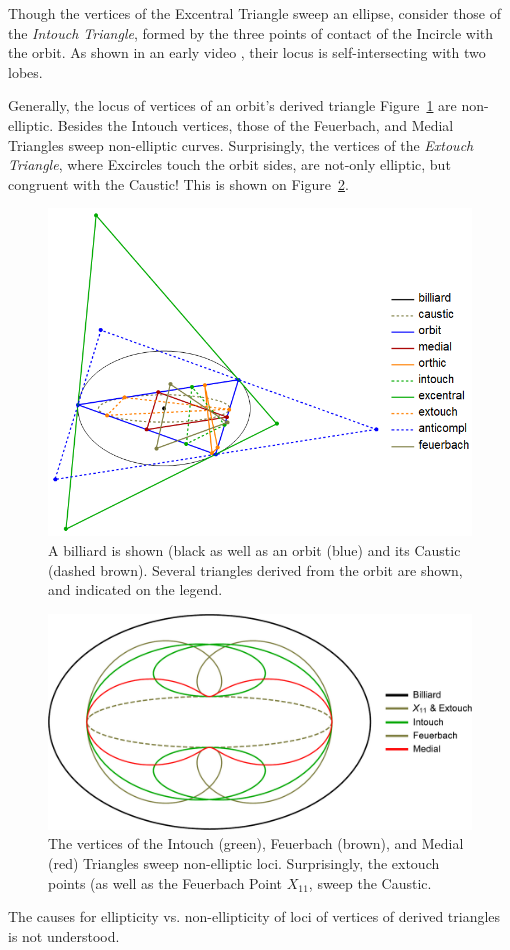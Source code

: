 Though the vertices of the Excentral Triangle sweep an ellipse, consider those of the {\em Intouch Triangle}, formed by the three points of contact of the Incircle with the orbit. As shown in an early video \cite{dsr_vid11b}, their locus is self-intersecting with two lobes.

Generally, the locus of vertices of an orbit's derived triangle Figure~\ref{fig:derived-tris} are non-elliptic. Besides the Intouch vertices, those of the Feuerbach, and Medial Triangles \cite{mw} sweep non-elliptic curves. Surprisingly, the vertices of the {\em Extouch Triangle}, where Excircles touch the orbit sides, are not-only elliptic, but congruent with the Caustic! This is shown on Figure~\ref{fig:non-elliptic}.



\begin{figure}[H]
    \centering
    \includegraphics[width=.75\textwidth]{pics/0043_derived-triangles.png}
    \caption{A billiard is shown (black as well as an orbit (blue) and its Caustic (dashed brown). Several triangles derived from the orbit are shown, and indicated on the legend.}
    \label{fig:derived-tris}
\end{figure}
%
\begin{figure}[H]
    \centering
    \includegraphics[height=.35\linewidth]{pics/0040_non_elliptic.pdf}
    \caption{The vertices of the Intouch (green), Feuerbach (brown), and Medial (red) Triangles sweep non-elliptic loci. Surprisingly, the extouch points (as well as the Feuerbach Point $X_{11}$, sweep the Caustic.}
    \label{fig:non-elliptic}
\end{figure}
The causes for ellipticity vs. non-ellipticity of loci of vertices of derived triangles is not   understood.
